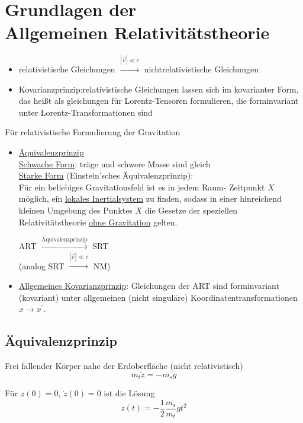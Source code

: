 \documentclass[a4paper, 11pt]{article}
\numberwithin{equation}{section}
\begin{document}
\newpage
\section{Grundlagen der \\Allgemeinen Relativitätstheorie}

\renewcommand{\labelitemi}{$\bullet$}
\begin{itemize}
\item relativistische Gleichungen $\xrightarrow{|\vec{v}| \ll c}$ nichtrelativistische Gleichungen

\item Kovarianzprinzip:relativistische Gleichungen lassen sich im kovarianter Form, das heißt als gleichungen für Lorentz-Tensoren formulieren, die forminvariant unter Lorentz-Transformationen sind
\end{itemize}

Für relativistische Formulierung der Gravitation
\begin{itemize}
\item \underline{Äquivalenzprinzip}\\
\underline{Schwache Form}: träge und schwere Masse sind gleich\\
\underline{Starke Form} (Einstein'sches Äquivalenzprinzip):\\
Für ein beliebiges Gravitationsfeld ist es in jedem Raum- Zeitpunkt $X$ möglich, ein \underline{lokales Inertialsystem} zu finden, sodass in einer hinreichend kleinen Umgebung des Punktes $X$ die Gesetze der speziellen Relativitätstheorie \underline{ohne Gravitation} gelten.

ART $\xrightarrow{\text{Äquivalenzprinzip}}$ SRT\\
(analog SRT $\xrightarrow{|\vec{v}| \ll c}$ NM)
\item \underline{Allgemeines Kovarianzprinzip}: Gleichungen der ART sind forminvariant (kovariant) unter allgemeinen (nicht singuläre) Koordinatentransformationen $x \rightarrow x^\prime$.
\end{itemize}

\subsection*{Äquivalenzprinzip}
Frei fallender Körper nahe der Erdoberfläche (nicht relativistisch)
\begin{equation*}
m_t \ddot{z} = -m_s g
\end{equation*}

Für $z(0) = 0$, $\dot{z}(0) = 0 $ ist die Lösung
\begin{equation}
z(t) = - \dfrac{1}{2} \dfrac{m_s}{m_t} g t^2
\end{equation}
\end{document}
